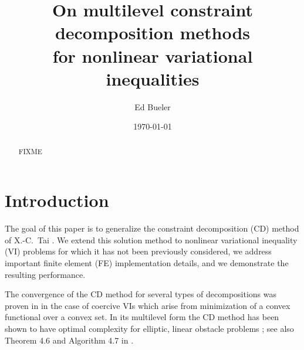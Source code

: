 \documentclass[letterpaper,final,12pt,reqno]{amsart}
\theoremstyle{cstyle}
\theoremstyle{cstyle*}
\theoremstyle{dstyle}
\numberwithin{equation}{section}
\numberwithin{figure}{section}
\numberwithin{table}{section}
\numberwithin{theorem}{section}
\begin{document}
\title[On multilevel constraint decomposition methods]{On multilevel constraint decomposition methods \\ for nonlinear variational inequalities}

\author{Ed Bueler}

\date{\today}

\begin{abstract} FIXME
\end{abstract}

\maketitle


\thispagestyle{empty}

\section{Introduction} \label{sec:intro}

The goal of this paper is to generalize the constraint decomposition (CD) method of X.-C.~Tai \cite{Tai2003}.  We extend this solution method to nonlinear variational inequality (VI) problems for which it has not been previously considered, we address important finite element (FE) implementation details, and we demonstrate the resulting performance.

The convergence of the CD method for several types of decompositions was proven in \cite{Tai2003} in the case of coercive VIs which arise from minimization of a convex functional over a convex set.  In its multilevel form the CD method has been shown to have optimal complexity for elliptic, linear obstacle problems \cite[subsection 5.4]{Tai2003}; see also Theorem 4.6 and Algorithm 4.7 in \cite{GraeserKornhuber2009}.
\end{document}

